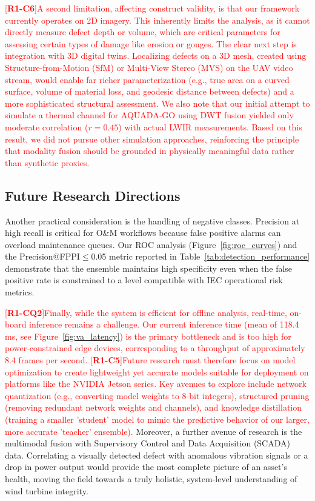 \documentclass[energies,article,submit,pdftex,moreauthors]{Definitions/mdpi}
\newcommand{\revtag}[2]{[\textbf{R#1-C#2}]}
\newcommand{\Rone}[1]{\textcolor{red}{#1}}
\begin{document}
\Rone{\revtag{1}{6}A second limitation, affecting construct validity, is that our framework currently operates on 2D imagery. This inherently limits the analysis, as it cannot directly measure defect depth or volume, which are critical parameters for assessing certain types of damage like erosion or gouges. The clear next step is integration with 3D digital twins. Localizing defects on a 3D mesh, created using Structure-from-Motion (SfM) or Multi-View Stereo (MVS) on the UAV video stream, would enable far richer parameterization (e.g., true area on a curved surface, volume of material loss, and geodesic distance between defects) and a more sophisticated structural assessment. We also note that our initial attempt to simulate a thermal channel for AQUADA‑GO using DWT fusion yielded only moderate correlation (\(r=0.45\)) with actual LWIR measurements. Based on this result, we did not pursue other simulation approaches, reinforcing the principle that modality fusion should be grounded in physically meaningful data rather than synthetic proxies.}

\subsection{Future Research Directions}
Another practical consideration is the handling of negative classes. Precision at high recall is critical for O\&M workflows because false positive alarms can overload maintenance queues. Our ROC analysis (Figure~\ref{fig:roc_curves}) and the Precision@FPPI\(\leq\)0.05 metric reported in Table~\ref{tab:detection_performance} demonstrate that the ensemble maintains high specificity even when the false positive rate is constrained to a level compatible with IEC operational risk metrics.

\Rone{\revtag{1}{Q2}Finally, while the system is efficient for offline analysis, real-time, on-board inference remains a challenge. Our current inference time (mean of 118.4 ms, see Figure~\ref{fig:va_latency}) is the primary bottleneck and is too high for power-constrained edge devices, corresponding to a throughput of approximately 8.4 frames per second.} \Rone{\revtag{1}{5}Future research must therefore focus on model optimization to create lightweight yet accurate models suitable for deployment on platforms like the NVIDIA Jetson series. Key avenues to explore include network quantization (e.g., converting model weights to 8-bit integers), structured pruning (removing redundant network weights and channels), and knowledge distillation (training a smaller 'student' model to mimic the predictive behavior of our larger, more accurate 'teacher' ensemble).} Moreover, a further avenue of research is the multimodal fusion with Supervisory Control and Data Acquisition (SCADA) data. Correlating a visually detected defect with anomalous vibration signals or a drop in power output would provide the most complete picture of an asset's health, moving the field towards a truly holistic, system-level understanding of wind turbine integrity.
\end{document}
